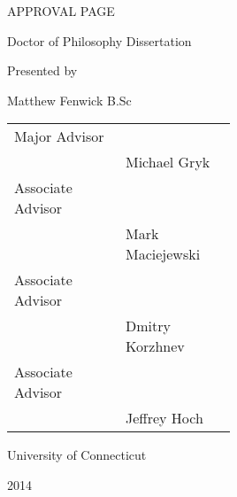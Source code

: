 \newpage
\begin{center}
  APPROVAL PAGE
  
  \vspace{1cm}
  
  Doctor of Philosophy Dissertation
  
  \vspace{1in}
  
  {\Large \mattftitle{}}
  
  \vspace{1in}
  
  Presented by
  
  Matthew Fenwick B.Sc
  
  \vspace{1cm}
  
  \begin{tabular}{  l  p{0.5\linewidth}  }  
    Major Advisor     &  \\
                    \cline{2-2}
                    & Michael Gryk \\
    Associate Advisor &  \\
                    \cline{2-2}
                    & Mark Maciejewski \\
    Associate Advisor &  \\
                    \cline{2-2}
                    & Dmitry Korzhnev \\
    Associate Advisor &  \\
                    \cline{2-2}
                    & Jeffrey Hoch \\
  \end{tabular}

  \vfill

  University of Connecticut
  
  2014  
\end{center}

